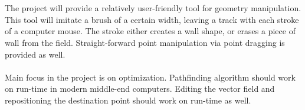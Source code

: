 \documentclass[a4paper,12pt]{article}
\begin{document}
\\
\\
The project will provide a relatively user-friendly tool for geometry manipulation. This tool will imitate a brush of a certain width, leaving a track with each stroke of a computer mouse. The stroke either creates a wall shape, or erases a piece of wall from the field. Straight-forward point manipulation via point dragging is provided as well.
\\
\\
Main focus in the project is on optimization. Pathfinding algorithm should work on run-time in
modern middle-end computers. Editing the vector field and repositioning the destination point
should work on run-time as well.
\end{document}

